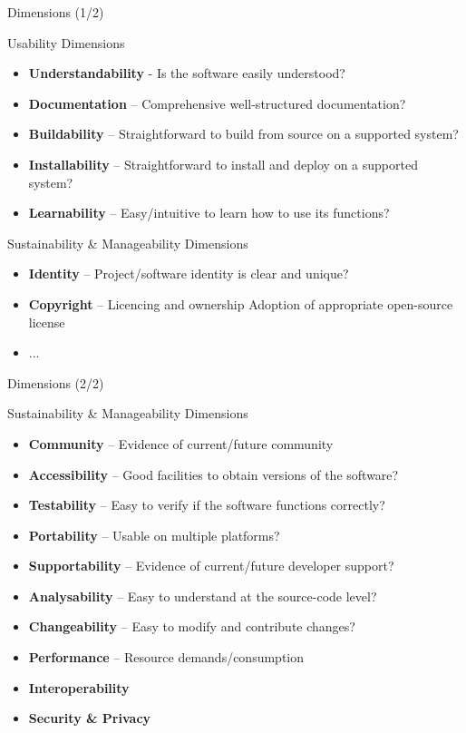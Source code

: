 \documentclass[compress]{beamer}
\begin{document}
\begin{frame}{Dimensions (1/2)}
    \begin{block}{Usability Dimensions}
        \begin{itemize}    
            \item \textbf{Understandability} - Is the software easily understood? 
            \item \textbf{Documentation} -- Comprehensive well-structured documentation?
            \item \textbf{Buildability}  -- Straightforward to build from source on a supported system?
            \item \textbf{Installability} -- Straightforward to install and deploy on a supported system?
            \item \textbf{Learnability} -- Easy/intuitive to learn how to use its functions?
        \end{itemize}
    \end{block}
    \begin{block}{Sustainability \& Manageability Dimensions}
        \begin{itemize}    
            \item \textbf{Identity} -- Project/software identity is clear and unique? 
            \item \textbf{Copyright} -- Licencing and ownership Adoption of appropriate open-source license
            \item ...
        \end{itemize}
    \end{block}
\end{frame}

\begin{frame}{Dimensions (2/2)}
    \begin{block}{Sustainability \& Manageability Dimensions}
        \begin{itemize}    
            \item \textbf{Community} -- Evidence of current/future community
            \item \textbf{Accessibility} -- Good facilities to obtain versions of the software?
            \item \textbf{Testability} -- Easy to verify if the software functions correctly?
            \item \textbf{Portability} -- Usable on multiple platforms?
            \item \textbf{Supportability} -- Evidence of current/future developer support?
            \item \textbf{Analysability} -- Easy to understand at the source-code level?
            \item \textbf{Changeability} -- Easy to modify and contribute changes? 
            \item \textbf{Performance} -- Resource demands/consumption
            \item \textbf{Interoperability} 
            \item \textbf{Security \& Privacy}
        \end{itemize}
    \end{block}
\end{frame}
\end{document}

